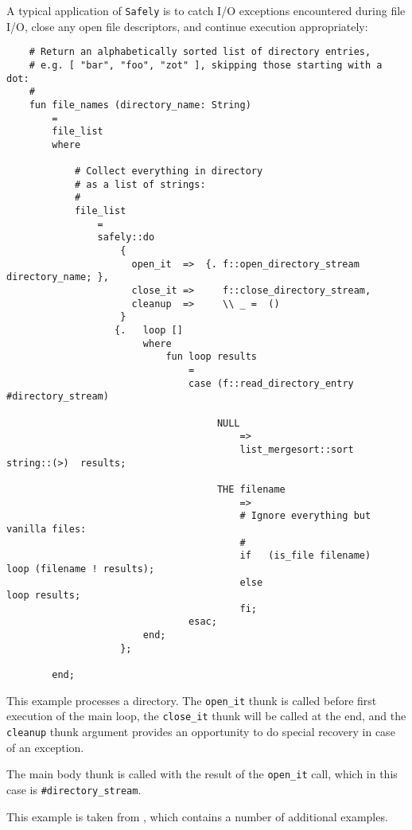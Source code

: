 
A typical application of {\tt Safely} is to catch {\sc I/O} exceptions encountered 
during file {\sc I/O}, close any open file descriptors, and continue execution 
appropriately:

\begin{verbatim}
    # Return an alphabetically sorted list of directory entries,
    # e.g. [ "bar", "foo", "zot" ], skipping those starting with a dot:
    #
    fun file_names (directory_name: String)
        =
        file_list
        where

            # Collect everything in directory
            # as a list of strings:
            #
            file_list
                =
                safely::do
                    {
                      open_it  =>  {. f::open_directory_stream  directory_name; },
                      close_it =>     f::close_directory_stream,
                      cleanup  =>     \\ _ =  ()
                    }
                   {.   loop []
                        where
                            fun loop results
                                =
                                case (f::read_directory_entry  #directory_stream)
                                  
                                     NULL
                                         =>
                                         list_mergesort::sort  string::(>)  results;

                                     THE filename
                                         =>
                                         # Ignore everything but vanilla files:
                                         #
                                         if   (is_file filename)   loop (filename ! results);
                                         else                      loop results;
                                         fi;
                                esac;
                        end;
                    };

        end;
\end{verbatim}

This example processes a directory.  The {\tt open\_it} thunk is called before first execution 
of the main loop, the {\tt close\_it} thunk will be called at the end, and the {\tt cleanup} 
thunk argument provides an opportunity to do special recovery in case of an exception.

The main body thunk is called with the result of the {\tt open\_it} call, which in this case 
is {\tt #directory\_stream}.

This example is taken from , which 
contains a number of additional examples.


